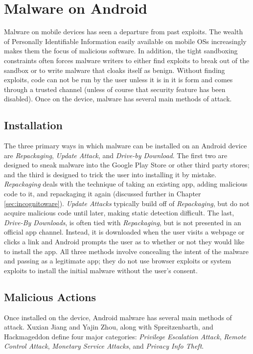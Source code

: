 \chapter{Malware on Android}
\label{sec:malware}

Malware on mobile devices has seen a departure from past exploits. The wealth of Personally Identifiable Information easily available on mobile OSs increasingly makes them the focus of malicious software. In addition, the tight sandboxing constraints often forces malware writers to either find exploits to break out of the sandbox or to write malware that cloaks itself as benign. Without finding exploits, code can not be run by the user unless it is in it is form and comes through a trusted channel (unless of course that security feature has been disabled). Once on the device, malware has several main methods of attack.

\section{Installation}
The three primary ways in which malware can be installed on an Android device are \textit{Repackaging}, \textit{Update Attack}, and \textit{Drive-by Download}\citep{zhou2012dissecting}. The first two are designed to sneak malware into the Google Play Store or other third party stores; and the third is designed to trick the user into installing it by mistake. \textit{Repackaging} deals with the technique of taking an existing app, adding malicious code to it, and repackaging it again (discussed further in Chapter \ref{sec:incognitoware}). \textit{Update Attacks} typically build off of \textit{Repackaging}, but do not acquire malicious code until later, making static detection difficult\citep{zhou2012dissecting}. The last, \textit{Drive-By Downloads}, is often tied with \textit{Repackaging}, but is not presented in an official app channel. Instead, it is downloaded when the user visits a webpage or clicks a link\citep{zhou2012dissecting} and Android prompts the user as to whether or not they would like to install the app. All three methods involve concealing the intent of the malware and passing as a legitimate app; they do not use browser exploits or system exploits to install the initial malware without the user's consent.

\section{Malicious Actions}
Once installed on the device, Android malware has several main methods of attack. Xuxian Jiang
 and Yajin Zhou\citep{zhou2012dissecting}, along with Spreitzenbarth\citep{spreitzenbarth2013}, and Hackmageddon\citep{hackmageddon2011} define four major categories: \textit{Privilege Escalation Attack}, \textit{Remote Control Attack}, \textit{Monetary Service Attacks}, and \textit{Privacy Info Theft}. 


